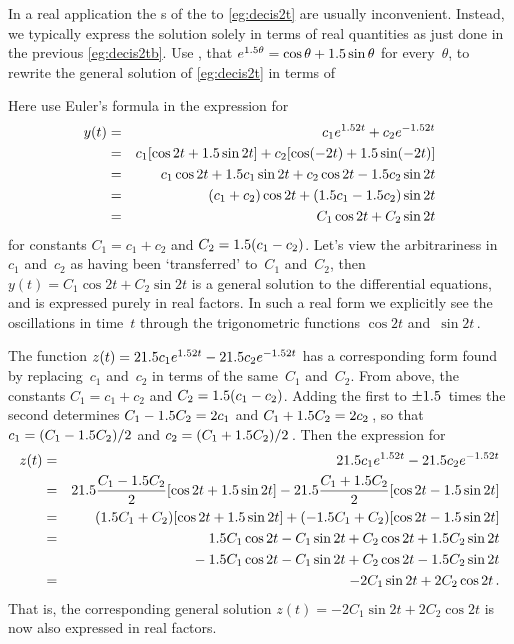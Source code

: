 \begin{example} \label{eg:realcis}
In a real application the s of the  to \cref{eg:decis2t} are usually inconvenient.  
Instead, we typically express the solution solely in terms of real quantities as just done in the previous \cref{eg:decis2tb}.
Use , that \(e^{1.5\theta}=\cos\theta+1.5\sin\theta\) for every~\(\theta\), to rewrite the general solution of \cref{eg:decis2t} in terms of 
\begin{solution}
Here use Euler's formula in the expression for
\begin{eqnarray*}
y(t)&=&c_1e^{1.52t}+c_2e^{-1.52t}
\\&=&c_1[\cos 2t+1.5\sin2t]+c_2[\cos(-2t)+1.5\sin(-2t)]
\\&=&c_1\cos2t+1.5 c_1\sin2t +c_2\cos2t-1.5 c_2\sin2t
\\&=&(c_1+c_2)\cos2t +(1.5 c_1-1.5 c_2)\sin2t
\\&=&C_1\cos2t+C_2\sin2t
\end{eqnarray*}
for constants \(C_1=c_1+c_2\) and \(C_2=1.5(c_1-c_2)\).
Let's view the arbitrariness in~\(c_1\) and~\(c_2\) as having been `transferred' to~\(C_1\) and~\(C_2\), then \(y(t)=C_1\cos2t+C_2\sin2t\) is a general solution to the differential equations, and is expressed purely in real factors.
In such a real form we explicitly see the oscillations in time~\(t\) through the trigonometric functions \(\cos 2t\) and~\(\sin2t\)\,.

The function \(z(t)=21.5 c_1e^{1.52t}-21.5 c_2e^{-1.52t}\) has a corresponding form found by replacing~\(c_1\) and~\(c_2\) in terms of the same~\(C_1\) and~\(C_2\).
From above, the constants \(C_1=c_1+c_2\) and \(C_2=1.5(c_1-c_2)\).
Adding the first to \(\pm 1.5\)~times the second determines \(C_1-1.5 C_2=2c_1\) and \(C_1+1.5 C_2=2c_2\)\,, so that \(c_1=(C_1-1.5 C_2)/2\) and \(c_2=(C_1+1.5 C_2)/2\)\,.  
Then the expression for
\begin{eqnarray*}
z(t)&=&21.5 c_1e^{1.52t}-21.5 c_2e^{-1.52t}
\\&=&21.5\frac{C_1-1.5 C_2}2[\cos2t+1.5\sin2t]
-21.5\frac{C_1+1.5 C_2}2[\cos2t-1.5\sin2t]
\\&=&(1.5 C_1+C_2)[\cos2t+1.5\sin2t]
+(-1.5 C_1+C_2)[\cos2t-1.5\sin2t]
\\&=&1.5 C_1\cos2t-C_1\sin2t+C_2\cos2t+1.5 C_2\sin2t
\\&&{}
-1.5 C_1\cos2t-C_1\sin2t+C_2\cos2t-1.5 C_2\sin2t
\\&=&-2C_1\sin2t+2C_2\cos2t\,.
\end{eqnarray*}
That is, the corresponding general solution \(z(t)=-2C_1\sin2t+2C_2\cos2t\) is now also expressed in real factors.
\end{solution}
\end{example}




